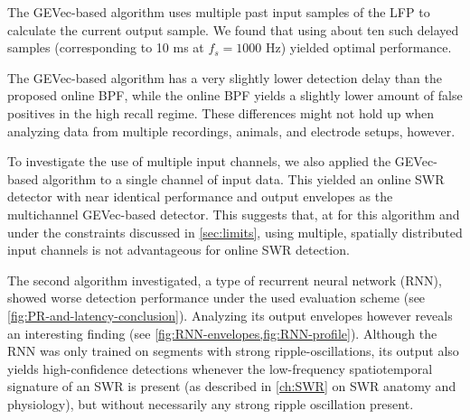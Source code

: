 The GEVec-based algorithm uses multiple past input samples of the LFP to calculate the current output sample. We found that using about ten such delayed samples (corresponding to 10 ms at $f_s = 1000$ Hz) yielded optimal performance.

The GEVec-based algorithm has a very slightly lower detection delay than the proposed online BPF, while the online BPF yields a slightly lower amount of false positives in the high recall regime. These differences might not hold up when analyzing data from multiple recordings, animals, and electrode setups, however.

To investigate the use of multiple input channels, we also applied the GEVec-based algorithm to a single channel of input data. This yielded an online SWR detector with near identical performance and output envelopes as the multichannel GEVec-based detector. This suggests that, at for this algorithm and under the constraints discussed in \cref{sec:limits}, using multiple, spatially distributed input channels is not advantageous for online SWR detection.

The second algorithm investigated, a type of recurrent neural network (RNN), showed worse detection performance under the used evaluation scheme (see \cref{fig:PR-and-latency-conclusion}). Analyzing its output envelopes however reveals an interesting finding (see \cref{fig:RNN-envelopes,fig:RNN-profile}). Although the RNN was only trained on segments with strong ripple-oscillations, its output also yields high-confidence detections whenever the low-frequency spatiotemporal signature of an SWR is present (as described in \cref{ch:SWR} on SWR anatomy and physiology), but without necessarily any strong ripple oscillation present.

